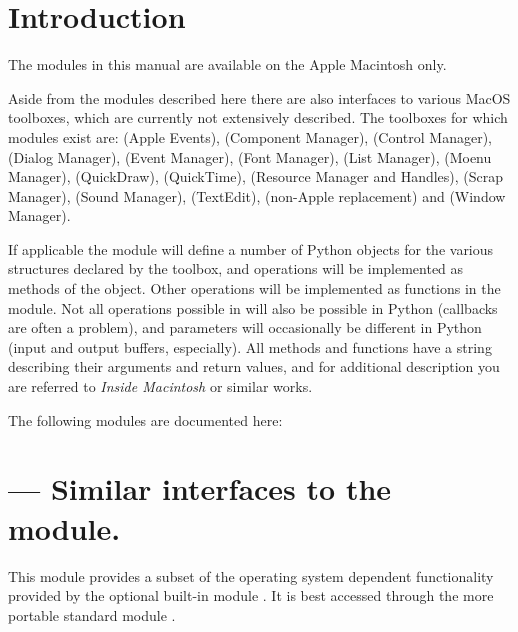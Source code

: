 \section{Introduction}
\label{intro}

The modules in this manual are available on the Apple Macintosh only.

Aside from the modules described here there are also interfaces to
various MacOS toolboxes, which are currently not extensively
described. The toolboxes for which modules exist are:
 (Apple Events),
 (Component Manager),
 (Control Manager),
 (Dialog Manager),
 (Event Manager),
 (Font Manager),
 (List Manager),
 (Moenu Manager),
 (QuickDraw),
 (QuickTime),
 (Resource Manager and Handles),
 (Scrap Manager),
 (Sound Manager),
 (TextEdit),
 (non-Apple  replacement) and
 (Window Manager).

If applicable the module will define a number of Python objects for
the various structures declared by the toolbox, and operations will be
implemented as methods of the object. Other operations will be
implemented as functions in the module. Not all operations possible in
\C{} will also be possible in Python (callbacks are often a problem), and
parameters will occasionally be different in Python (input and output
buffers, especially). All methods and functions have a 
string describing their arguments and return values, and for
additional description you are referred to \emph{Inside Macintosh} or
similar works.

The following modules are documented here:

\localmoduletable


\section{ ---
         Similar interfaces to the  module.}



This module provides a subset of the operating system dependent
functionality provided by the optional built-in module .
It is best accessed through the more portable standard module
.

